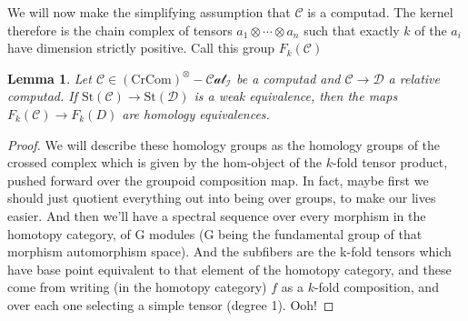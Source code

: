 \documentclass[12pt]{article}
\newtheorem{lemma}[theorem]{Lemma}
\theoremstyle{definition}
\newcommand{\C}{\mathcal{C}}
\newcommand{\D}{\mathcal{D}}
\newcommand{\crcom}{\text{CrCom}}
\newcommand{\tensorcrossedcat}{(\crcom)^\otimes-\mathcal{Cat}}
\newcommand{\st}{\text{St}}
\begin{document}
	We will now make the simplifying assumption that $\C$ is a computad.
	The kernel therefore is the chain complex of tensors $a_1 \otimes \cdots \otimes a_n $ such that exactly $k$ of the $a_i$ have dimension strictly positive. Call this group $F_k(\C)$
	\begin{lemma}
		Let $\C \in \tensorcrossedcat_\mathcal{I}$ be a computad and $\C \to \D$ a relative computad. 
		If $\st(\C) \to \st(\D)$ is a weak equivalence, then the maps $F_k(\C) \to F_k(D)$ are homology equivalences.
	\end{lemma}
	\begin{proof}
		We will describe these homology groups as the homology groups of the crossed complex which is given by the hom-object of the $k$-fold tensor product, pushed forward over the groupoid composition map. In fact, maybe first we should just quotient everything out into being over groups, to make our lives easier. And then we'll have a spectral sequence over every morphism in the homotopy category, of G modules (G being the fundamental group of that morphism automorphism space). And the subfibers are the k-fold tensors which have base point equivalent to that element of the homotopy category, and these come from writing (in the homotopy category) $f$ as a $k$-fold composition, and over each one selecting a simple tensor (degree 1). Ooh!
	\end{proof}
\end{document}
